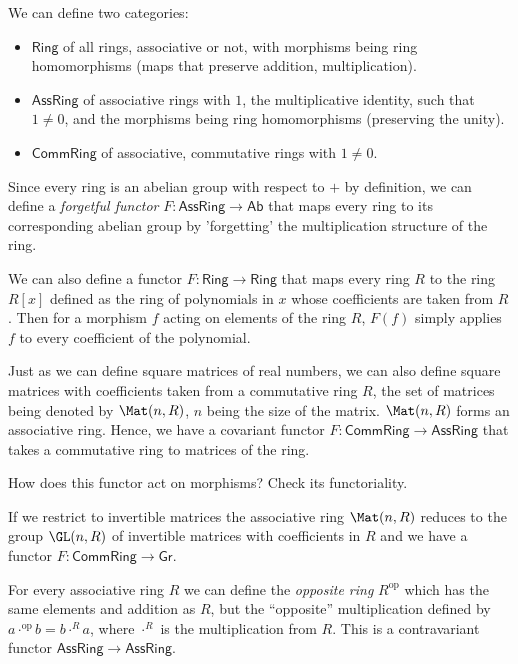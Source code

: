 We can define two categories:
\begin{itemize}
\item $\mathsf{Ring}$ of all rings, associative or not, with morphisms
being ring homomorphisms (maps that preserve addition, multiplication).
\item $\mathsf{AssRing}$ of associative rings with $1$, the multiplicative
identity, such that $1\neq0$, and the morphisms being ring homomorphisms
(preserving the unity).
\item $\mathsf{CommRing}$ of associative, commutative rings with $1\neq0$. 
\end{itemize}
\begin{example}
Since every ring is an abelian group with respect to $+$ by definition,
we can define a \emph{forgetful functor} $F:\mathsf{AssRing}\rightarrow\mathsf{Ab}$
that maps every ring to its corresponding abelian group by 'forgetting'
the multiplication structure of the ring.
\end{example}
%
\begin{example}
We can also define a functor $F:\mathsf{Ring}\rightarrow\mathsf{Ring}$
that maps every ring $R$ to the ring $R[x]$ defined as the ring
of polynomials in $x$ whose coefficients are taken from $R$. Then
for a morphism $f$ acting on elements of the ring $R$, $F\left(f\right)$
simply applies $f$ to every coefficient of the polynomial.
\end{example}
%
\begin{example}
Just as we can define square matrices of real numbers, we can also
define square matrices with coefficients taken from a commutative
ring $R$, the set of matrices being denoted by $\Mat(n,R)$,
$n$ being the size of the matrix. $\Mat(n,R)$ forms an associative
ring. Hence, we have a covariant functor $F:\mathsf{CommRing}\rightarrow\mathsf{AssRing}$
that takes a commutative ring to matrices of the ring. 
\end{example}
\begin{xca}
How does this functor act on morphisms? Check its functoriality.
\end{xca}
\begin{example}
If we restrict to invertible matrices the associative ring $\Mat(n,R)$
reduces to the group $\GL(n,R)$ of invertible matrices with
coefficients in $R$ and we have a functor $F:\mathsf{CommRing}\rightarrow\mathsf{Gr}$.
\end{example}
%
\begin{example}
For every associative ring $R$ we can define the \emph{opposite
ring} $R^{\text{op}}$ which has the same elements and addition as
$R$, but the ``opposite'' multiplication defined by $a\cdot^{\text{op}}b=b\cdot^{R}a$,
where $\cdot^{R}$ is the multiplication from $R$. This is a contravariant
functor $\mathsf{AssRing}\to\mathsf{AssRing}$.
\end{example}
